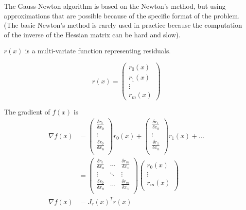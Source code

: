 The Gauss-Newton algorithm is based on the Newton's method, but using approximations that are possible because of the specific format of the problem. (The basic Newton's method is rarely used in practice because the computation of the inverse of the Hessian matrix can be hard and slow).


$r(x)$ is a multi-variate function representing residuals.

\begin{equation}
    r(x) = \left(\begin{array}{c}
        r_0(x)  \\
        r_1(x) \\
        \vdots \\
        r_m(x)
    \end{array}\right)
\end{equation}

The gradient of $f(x)$ is
\begin{equation}
\begin{split}
    \nabla f(x) &= \left(\begin{array}{c}
        \frac{\delta r_0}{\delta x_0}  \\
        \vdots  \\
        \frac{\delta r_0}{\delta x_n}  \\
    \end{array}\right) r_0(x) + 
     \left(\begin{array}{c}
        \frac{\delta r_1}{\delta x_0}  \\
        \vdots  \\
        \frac{\delta r_1}{\delta x_n}  \\
    \end{array}\right) r_1(x) + \dots \\
 &= \left(\begin{array}{ccc}
     \frac{\delta r_0}{\delta x_0} & \dots & \frac{\delta r_m}{\delta x_0}  \\
     \vdots & \ddots & \vdots \\
     \frac{\delta r_0}{\delta x_n} & \dots & \frac{\delta r_m}{\delta x_n}  \\
 \end{array}\right) \left(\begin{array}{c}
     r_0(x) \\
     \vdots \\
     r_m(x) \\
 \end{array}\right) \\
 \nabla f(x) &= J_r(x)^T r(x)
 \end{split}
\end{equation}

